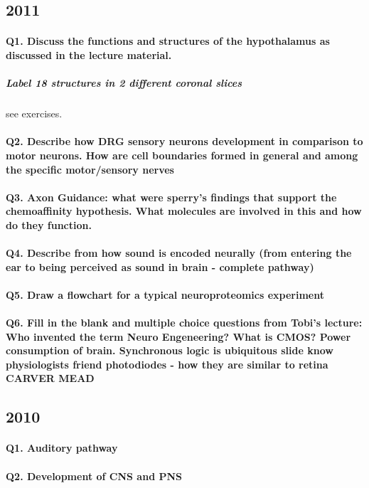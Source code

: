 \documentclass[12pt,article,oneside,a4paper]{memoir}
\begin{document}
\subsection{2011}
\paragraph{Q1. Discuss the functions and structures of the hypothalamus as discussed in the lecture material.}
\subparagraph{Label 18 structures in 2 different coronal slices} see exercises.
\paragraph{Q2. Describe how DRG sensory neurons development in comparison to motor neurons. How are cell boundaries formed in general and among the specific motor/sensory nerves}
\paragraph{Q3. Axon Guidance: what were sperry's findings that support the chemoaffinity hypothesis. What molecules are involved in this and how do they function.}
\paragraph{Q4. Describe from how sound is encoded neurally (from entering the ear to being perceived as sound in brain - complete pathway)}
\paragraph{Q5. Draw a flowchart for a typical neuroproteomics experiment}
\paragraph{Q6. Fill in the blank and multiple choice questions from Tobi's lecture: Who invented the term Neuro Engeneering? What is CMOS? Power consumption of brain. Synchronous logic is ubiquitous slide know physiologists friend photodiodes - how they are similar to retina CARVER MEAD}


\subsection{2010}
\paragraph{Q1. Auditory pathway}
\paragraph{Q2. Development of CNS and PNS}
\end{document}
